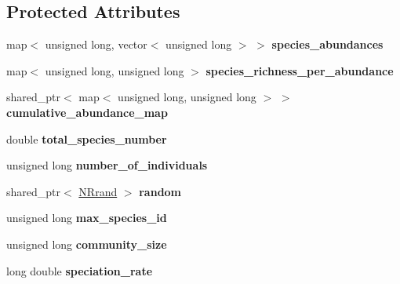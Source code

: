 \subsection*{Protected Attributes}
\begin{DoxyCompactItemize}
\item 
map$<$ unsigned long, vector$<$ unsigned long $>$ $>$ {\bfseries species\+\_\+abundances}\hypertarget{class_simulated_species_abundances_handler_aa3b7e675a3953083ce77525d525b3c73}{}\label{class_simulated_species_abundances_handler_aa3b7e675a3953083ce77525d525b3c73}

\item 
map$<$ unsigned long, unsigned long $>$ {\bfseries species\+\_\+richness\+\_\+per\+\_\+abundance}\hypertarget{class_simulated_species_abundances_handler_ab930e62058933c0d495b6129a23d820e}{}\label{class_simulated_species_abundances_handler_ab930e62058933c0d495b6129a23d820e}

\item 
shared\+\_\+ptr$<$ map$<$ unsigned long, unsigned long $>$ $>$ {\bfseries cumulative\+\_\+abundance\+\_\+map}\hypertarget{class_simulated_species_abundances_handler_a0a1322a916b90dcccf70fa84d00ba850}{}\label{class_simulated_species_abundances_handler_a0a1322a916b90dcccf70fa84d00ba850}

\item 
double {\bfseries total\+\_\+species\+\_\+number}\hypertarget{class_simulated_species_abundances_handler_ab75f1fdf0a913607750ecbc6508bce53}{}\label{class_simulated_species_abundances_handler_ab75f1fdf0a913607750ecbc6508bce53}

\item 
unsigned long {\bfseries number\+\_\+of\+\_\+individuals}\hypertarget{class_simulated_species_abundances_handler_a9acd86a1ec9d2c19b0e6af79ceca88cb}{}\label{class_simulated_species_abundances_handler_a9acd86a1ec9d2c19b0e6af79ceca88cb}

\item 
shared\+\_\+ptr$<$ \hyperlink{class_n_rrand}{N\+Rrand} $>$ {\bfseries random}\hypertarget{class_species_abundances_handler_a9adf19e91e8b615a0aeba2d96be95109}{}\label{class_species_abundances_handler_a9adf19e91e8b615a0aeba2d96be95109}

\item 
unsigned long {\bfseries max\+\_\+species\+\_\+id}\hypertarget{class_species_abundances_handler_a7b020381eff35fc37d0bd97782728d6b}{}\label{class_species_abundances_handler_a7b020381eff35fc37d0bd97782728d6b}

\item 
unsigned long {\bfseries community\+\_\+size}\hypertarget{class_species_abundances_handler_afb4de4e0814f76d4c978f93a6f7cdabd}{}\label{class_species_abundances_handler_afb4de4e0814f76d4c978f93a6f7cdabd}

\item 
long double {\bfseries speciation\+\_\+rate}\hypertarget{class_species_abundances_handler_aa945e9f660b2d8aa7d5b36d7bbd0fda6}{}\label{class_species_abundances_handler_aa945e9f660b2d8aa7d5b36d7bbd0fda6}

\end{DoxyCompactItemize}


